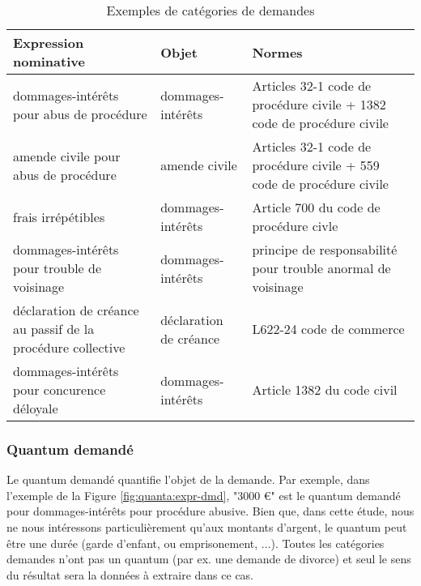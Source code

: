 \begin{table}[h!]
\scriptsize
\begin{tabular}{|p{}|p{}|p{}|}
\hline
\textbf{Expression nominative  }                                     & \textbf{Objet}                                                       & \textbf{Normes}                                                                 \\ \hline
dommages-intérêts pour abus de procédure                    & dommages-intérêts                                           & Articles 32-1 code de procédure civile + 1382 code de procédure civile \\ \hline
amende civile pour abus de procédure                        & amende civile                                               & Articles 32-1 code de procédure civile + 559 code de procédure civile  \\ \hline
frais irrépétibles                                          & dommages-intérêts                                           & Article 700 du code de procédure civle                                 \\ \hline
dommages-intérêts pour trouble de voisinage                 & dommages-intérêts                                           & principe de responsabilité pour trouble anormal de voisinage           \\ \hline
déclaration de créance au passif de la procédure collective & déclaration de créance & L622-24 code de commerce                                               \\ \hline
dommages-intérêts pour concurence déloyale                  & dommages-intérêts                                           & Article 1382 du code civil                                             \\ \hline
\end{tabular}
\caption{Exemples de catégories de demandes}\label{tab:quanta:exemple-categorie}
\end{table}

\subsubsection{Quantum demandé}
Le quantum demandé quantifie l'objet de la demande. Par exemple, dans l'exemple de la Figure \ref{fig:quanta:expr-dmd}, "3000 \euro{}" est le quantum demandé pour dommages-intérêts pour procédure abusive. Bien que, dans cette étude, nous ne nous intéressons particulièrement qu'aux montants d'argent, le quantum peut être une durée (garde d'enfant, ou emprisonement, ...). Toutes les catégories demandes n'ont pas un quantum (par ex. une demande de divorce) et seul le sens du résultat sera la données à extraire dans ce cas.

